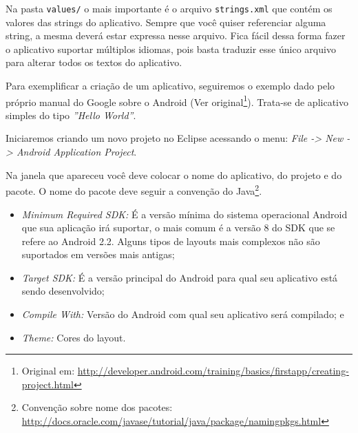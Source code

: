 \documentclass[a4paper,12pt,brazil,doubleside]{book}
\begin{document}
Na pasta \texttt{values/} o mais importante é o arquivo \texttt{strings.xml} que contém os valores das strings do aplicativo. Sempre que você quiser referenciar alguma string, a mesma deverá estar expressa nesse arquivo. Fica fácil dessa forma fazer o aplicativo suportar múltiplos idiomas, pois basta traduzir esse único arquivo para alterar todos os textos do aplicativo.

Para exemplificar a criação de um aplicativo, seguiremos o exemplo dado pelo próprio manual do Google sobre o Android 
(Ver original\footnote{Original em: \href{http://developer.android.com/training/basics/firstapp/creating-project.html}{http://developer.android.com/training/basics/firstapp/creating-project.html}}). 
Trata-se de aplicativo simples do tipo \emph{''Hello World''}.

Iniciaremos criando um novo projeto no Eclipse acessando o menu: \emph{File -> New -> Android Application Project}.

Na janela que apareceu você deve colocar o nome do aplicativo, do projeto e do pacote. O nome do pacote deve seguir a convenção do Java\footnote{Convenção sobre nome dos pacotes: \href{http://docs.oracle.com/javase/tutorial/java/package/namingpkgs.html}{http://docs.oracle.com/javase/tutorial/java/package/namingpkgs.html}}.
\begin{itemize}[noitemsep]
	\item \textit{Minimum Required SDK:} É a versão mínima do sistema operacional Android que sua aplicação irá suportar, o mais comum é a versão 8 do SDK que se refere ao Android 2.2. Alguns tipos de layouts mais complexos não são suportados em versões mais antigas;
	\item \textit{Target SDK:} É a versão principal do Android para qual seu aplicativo está sendo desenvolvido;
	\item \textit{Compile With:} Versão do Android com qual seu aplicativo será compilado; e
	\item \textit{Theme:} Cores do layout.
\end{itemize}
\end{document}
